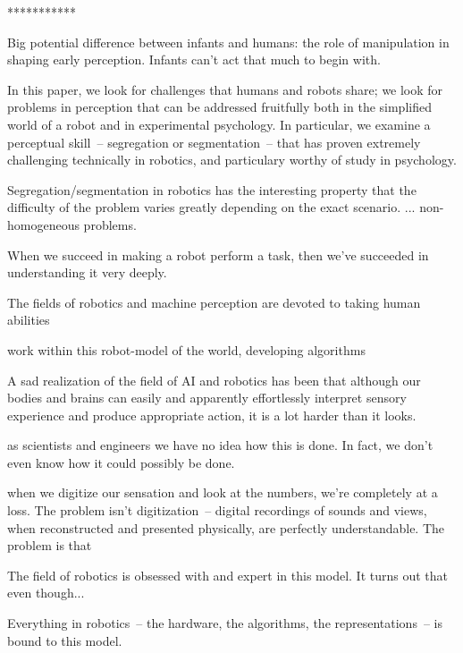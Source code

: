 ***********

Big potential difference between infants and humans: the role
of manipulation in shaping early perception.  Infants can't
act that much to begin with.



\ifverbose

In this paper, we look for challenges that humans and robots share;
we look for problems in perception that can be addressed fruitfully
both in the simplified world of a robot and in experimental psychology.
%
In particular, we examine a perceptual skill~-- segregation or
segmentation~-- that has proven extremely challenging technically
in robotics, and particulary worthy of study in psychology.


Segregation/segmentation in robotics has the interesting property that
the difficulty of the problem varies greatly depending on the exact
scenario. ... non-homogeneous problems.


When we succeed in making a robot perform a task, then we've succeeded
in understanding it very deeply.

The fields of robotics and machine perception are devoted to
taking human abilities

work within this
robot-model of the world, developing algorithms 


A sad realization of the field of AI and robotics has been that
although our bodies and brains can easily and apparently effortlessly
interpret sensory experience and produce appropriate action,
it is a lot harder than it looks.



as scientists and engineers we have no idea how this is done.
In fact, we don't even know how it could possibly be done.


when we digitize our sensation and look
at the numbers, we're completely at a loss.  The problem isn't 
digitization~-- digital recordings of sounds and views, when reconstructed
and presented physically, are perfectly understandable.  The problem
is that


The field of robotics is obsessed with and expert in this model.
It turns out that even though...


Everything in robotics~-- the hardware, the algorithms, the
representations~-- is bound to this model.



\fi
